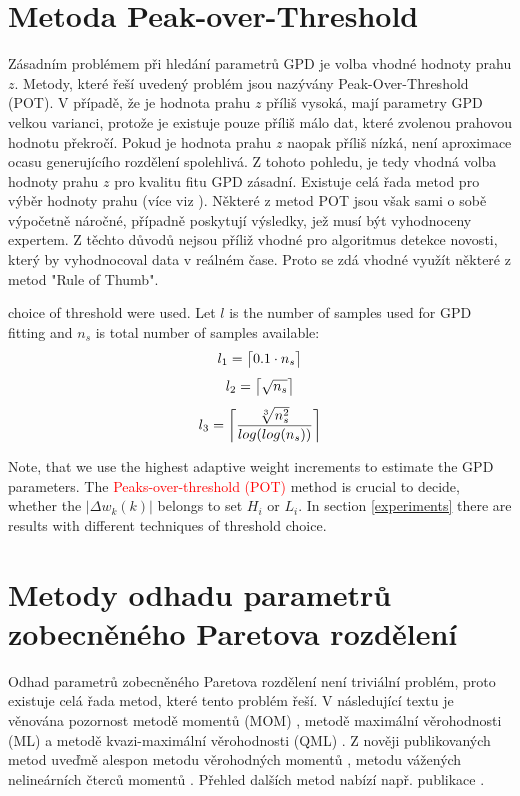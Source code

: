 \section{Metoda Peak-over-Threshold}
Zásadním problémem při hledání parametrů GPD je volba vhodné hodnoty prahu $z$. Metody, které řeší uvedený problém jsou nazývány Peak-Over-Threshold (POT). V případě, že je hodnota prahu $z$ příliš vysoká, mají parametry GPD velkou varianci, protože je existuje pouze příliš málo dat, které zvolenou prahovou hodnotu překročí. Pokud je hodnota prahu $z$ naopak příliš nízká, není aproximace ocasu generujícího rozdělení spolehlivá.  Z tohoto pohledu, je tedy vhodná volba hodnoty prahu $z$ pro kvalitu fitu GPD zásadní. Existuje celá řada metod pro výběr hodnoty prahu (více viz \cite{scarrott2012review}). Některé z metod POT jsou však sami o sobě výpočetně náročné, případně poskytují výsledky, jež musí být vyhodnoceny expertem. Z těchto důvodů nejsou příliž vhodné pro algoritmus detekce novosti, který by vyhodnocoval data v reálném čase. Proto se zdá vhodné využít některé z metod "Rule of Thumb".

 \cite{dumouchel1983estimating,ferreira2003optimising,loretan1994testing} choice of threshold were used. Let $l$ is the number of samples used for GPD fitting and $n_s$ is total number of samples available:
\begin{equation} \label{eq:l1}
    l_1=\ceil[\big]{0.1 \cdot n_s}
\end{equation}
\begin{equation} \label{eq:l2}
    l_2=\ceil[\big]{\sqrt{n_s}}
\end{equation}
\begin{equation} \label{eq:l3}
     l_3=\ceil[\bigg]{\frac{\sqrt[3]{n_s^{2}}}{log(log(n_s))}}
\end{equation}

Note, that we use the highest adaptive weight increments to estimate the GPD parameters. The \textcolor{red}{Peaks-over-threshold (POT)} method is crucial to decide, whether the $|\Delta w_k(k)|$ belongs to set $H_i$ or $L_i$. In section \ref{experiments} there are results with different techniques of threshold choice.

\section{Metody odhadu parametrů zobecněného Paretova rozdělení}
Odhad parametrů zobecněného Paretova rozdělení není triviální problém, proto existuje celá řada metod, které tento problém řeší. V následující textu je věnována pozornost metodě momentů (MOM) \cite{mom_orig}, metodě maximální věrohodnosti (ML) \cite{DuMouchel} a metodě kvazi-maximální věrohodnosti (QML) \cite{Luceno}. Z nověji publikovaných metod uveďmě alespon metodu věrohodných momentů \cite{zhang1}, metodu vážených nelineárních čterců momentů \cite{zhao1,park}. Přehled dalších metod nabízí např. publikace \cite{gpd_est}.
